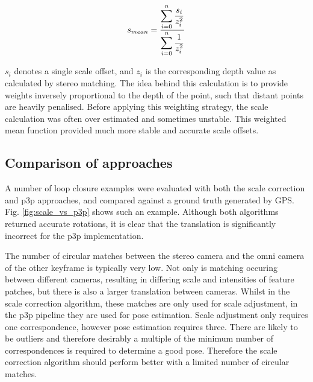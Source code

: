 \begin{equation}
\centering
s_{mean} = \dfrac{\displaystyle\sum\limits_{i=0}^n{\dfrac{s_i}{z_i^2}}}
{\displaystyle\sum\limits_{i=0}^n{\dfrac{1}{z_i^2}}}
\end{equation}

$s_i$ denotes a single scale offset, and $z_i$ is the corresponding depth value as calculated by stereo matching.  The idea behind this calculation is to provide weights inversely proportional to the depth of the point, such that distant points are heavily penalised.  Before applying this weighting strategy, the scale calculation was often over estimated and sometimes unstable.  This weighted mean function provided much more stable and accurate scale offsets.



\subsection{Comparison of approaches}

A number of loop closure examples were evaluated with both the scale correction and p3p approaches, and compared against a ground truth generated by GPS.  Fig. \ref{fig:scale_vs_p3p} shows such an example.  Although both algorithms returned accurate rotations, it is clear that the translation is significantly incorrect for the p3p implementation.

The number of circular matches between the stereo camera and the omni camera of the other keyframe is typically very low.  Not only is matching occuring between different cameras, resulting in differing scale and intensities of feature patches, but there is also a larger translation between cameras. Whilst in the scale correction algorithm, these matches are only used for scale adjustment, in the p3p pipeline they are used for pose estimation.  Scale adjustment only requires one correspondence, however pose estimation requires three.  There are likely to be outliers and therefore desirably a multiple of the minimum number of correspondences is required to determine a good pose.  Therefore the scale correction algorithm should perform better with a limited number of circular matches.

